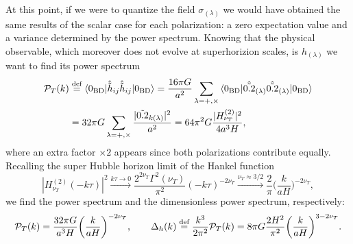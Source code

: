 At this point, if we were to quantize the field $\sigma_{(\lambda)}$ we would have obtained the same results of the scalar case for each polarization: a zero expectation value and a variance determined by the power spectrum. Knowing that the physical observable, which moreover does not evolve at superhorizion scales, is $h_{(\lambda)}$ we want to find its power spectrum
\begin{align*}
    \mathcal{P}_T(k)&\stackrel{\text{def}}{=}\braket{0_\text{BD}|\hat{\tilde h}_{ij}\hat{\tilde h}_{ij}|0_\text{BD}}=\frac{16\pi G}{a^2}\sum_{\lambda=+,\times}\braket{0_\text{BD}|\hat{\tilde{0.2}}_{\mathbf(\lambda)}\hat{\tilde{0.2}}_{\mathbf(\lambda)}|0_\text{BD}} \\&=32\pi G\sum_{\lambda=+,\times}\frac{|\tilde{0.2}_{k(\lambda)}|^2}{a^2}=64\pi^2 G\frac{|H_{\nu_T}^{(2)}|^2}{4a^3H},
\end{align*}
where an extra factor $\times 2 $ appears since both polarizations contribute equally. Recalling the super Hubble horizon limit of the Hankel function
\begin{equation}
    |H_{\nu_T}^{(2)}(-k\tau)|^2\xrightarrow{k\tau\to 0}\frac{2^{2\nu_T}\Gamma^2(\nu_T)}{\pi^2}(-k\tau)^{-2\nu_T}\xrightarrow{\nu_T\approx3/2}\frac{2}{\pi}\bigg(\frac{k}{aH}\bigg)^{-2\nu_T},
\end{equation}
we find the power spectrum and the dimensionless power spectrum, respectively:
\begin{equation}
    \mathcal{P}_T(k)=\frac{32\pi G}{a^3H}\bigg(\frac{k}{aH}\bigg)^{-2\nu_T},\qquad\Delta_h(k)\stackrel{\text{def}}{=}\frac{k^3}{2\pi^2}\mathcal{P}_T(k)=8\pi G\frac{2H^2}{\pi^2}\bigg(\frac{k}{aH}\bigg)^{3-2\nu_T}.\label{eq:tensor_power_spectrum}
\end{equation}
